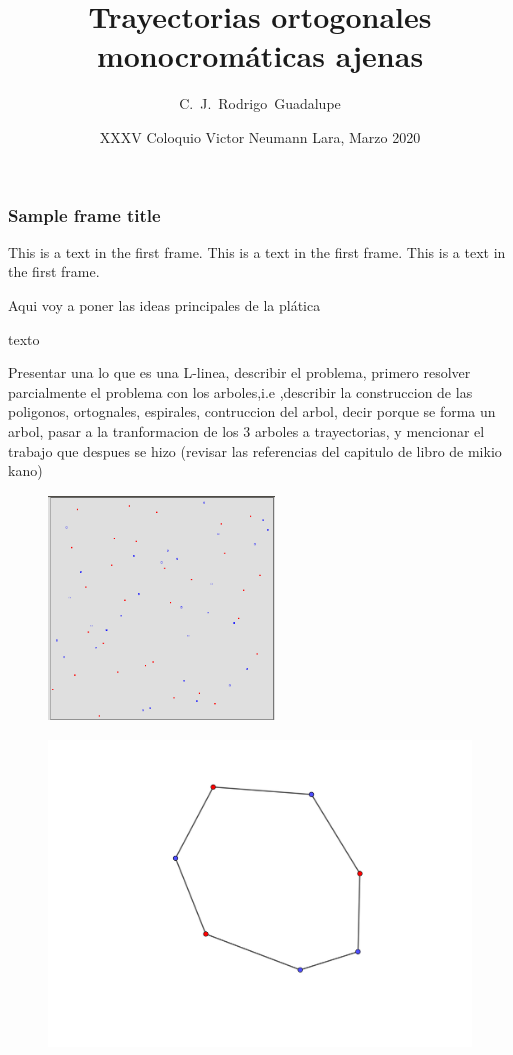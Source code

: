 \documentclass{beamer}
\title[Trayectorias ortogonales monocromáticas ajenas] %
{Trayectorias ortogonales monocromáticas ajenas}
\subtitle{}
\author[Rodrigo] %
{C.~J.~Rodrigo~Guadalupe\inst{1}}
\institute[VFU] %
{
  \inst{1}%
  Instituto de Matemáticas\\
  Universidad Nacional Autónoma de México

}
\date[VNL 2020] %
{XXXV Coloquio Victor Neumann Lara, Marzo 2020}
\begin{document}
\frame{\titlepage}

\begin{frame}
\frametitle{Sample frame title}
This is a text in the first frame. This is a text in the first frame. This is a text in the first frame.
\end{frame}

\begin{frame}
 Aqui voy a poner las ideas principales de la plática \pause

texto \pause

Presentar una lo que es una L-linea, describir el problema, primero resolver parcialmente el problema con los arboles,i.e ,describir la construccion de las poligonos, ortognales, espirales, contruccion del arbol, decir porque se forma un arbol, pasar a la tranformacion de los 3 arboles a trayectorias, y mencionar el trabajo que despues se hizo (revisar las referencias del capitulo de libro de mikio kano)
\end{frame}
\begin{frame}
\begin{figure}[h]
\includegraphics[width=6cm, height=6cm]{n-puntos}
\end{figure}
\end{frame}
\begin{frame}
\begin{figure}[h]
\includegraphics[width=\textwidth]{tauDeRyB}
\end{figure}
\end{frame}
\end{document}
